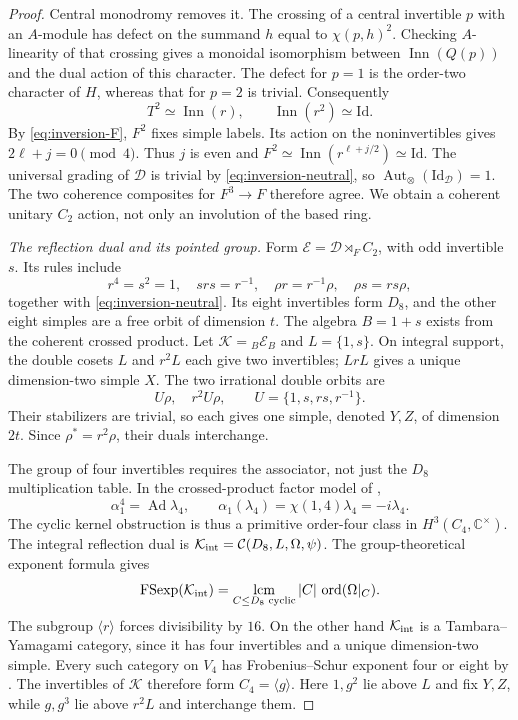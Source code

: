 \begin{proof}
Central monodromy removes it. The crossing of a central invertible
$p$ with an $A$-module has defect on the summand $h$ equal to
$\chi(p,h)^2$. Checking $A$-linearity of that crossing gives a
monoidal isomorphism between $\operatorname{Inn}(Q(p))$ and the dual
action of this character. The defect for $p=1$ is the order-two
character of $H$, whereas that for $p=2$ is trivial. Consequently
\[
 T^2\simeq\operatorname{Inn}(r),\qquad
 \operatorname{Inn}(r^2)\simeq\mathrm{Id}.
\]
By \eqref{eq:inversion-F}, $F^2$ fixes simple labels. Its action on
the noninvertibles gives $2\ell+j=0\pmod4$. Thus $j$ is even and
$F^2\simeq\operatorname{Inn}(r^{\ell+j/2})\simeq\mathrm{Id}$.
The universal grading of $\mathcal D$ is trivial by
\eqref{eq:inversion-neutral}, so
$\operatorname{Aut}_\otimes(\mathrm{Id}_{\mathcal D})=1$.
The two coherence composites for $F^3\to F$ therefore agree.
We obtain a coherent unitary $C_2$ action, not only an involution of
the based ring.

\emph{The reflection dual and its pointed group.}
Form $\mathcal E=\mathcal D\rtimes_F C_2$, with odd invertible $s$.
Its rules include
\[
 r^4=s^2=1,\quad srs=r^{-1},\quad
 \rho r=r^{-1}\rho,\quad \rho s=rs\rho,
\]
together with \eqref{eq:inversion-neutral}. Its eight invertibles form
$D_8$, and the other eight simples are a free orbit of dimension $t$.
The algebra $B=1+s$ exists from the coherent crossed product.
Let $\mathcal K={}_B\mathcal E_B$ and $L=\{1,s\}$.
On integral support, the double cosets $L$ and $r^2L$ each give two
invertibles; $LrL$ gives a unique dimension-two simple $X$.
The two irrational double orbits are
\[
 U\rho,\quad r^2U\rho,\qquad U=\{1,s,rs,r^{-1}\}.
\]
Their stabilizers are trivial, so each gives one simple, denoted $Y,Z$,
of dimension $2t$. Since $\rho^*=r^2\rho$, their duals interchange.

The group of four invertibles requires the associator, not just the
$D_8$ multiplication table. In the crossed-product factor model of
\cite[Section~12.1]{IzumiNear},
\[
 \alpha_1^4=\operatorname{Ad}\lambda_4,\qquad
 \alpha_1(\lambda_4)=\chi(1,4)\lambda_4=-i\lambda_4.
\]
The cyclic kernel obstruction is thus a primitive order-four class
in $H^3(C_4,\mathbb C^\times)$. The integral reflection dual is
$\mathcal K_{\rm int}=\mathcal C(D_8,L,\Omega,\psi)$.
The group-theoretical exponent formula
\cite[Theorem~9.2]{NgSchauenburgExponent} gives
\[
 \operatorname{FSexp}(\mathcal K_{\rm int})
 =\mathop{\rm lcm}_{C\le D_8\text{ cyclic}}
   |C|\,\operatorname{ord}(\Omega|_C).
\]
The subgroup $\langle r\rangle$ forces divisibility by $16$.
On the other hand $\mathcal K_{\rm int}$ is a Tambara--Yamagami
category, since it has four invertibles and a unique dimension-two
simple. Every such category on $V_4$ has Frobenius--Schur exponent
four or eight by \cite[Proposition~5.3]{LiuNgTotal}. The invertibles
of $\mathcal K$ therefore form $C_4=\langle g\rangle$.
Here $1,g^2$ lie above $L$ and fix $Y,Z$, while $g,g^3$ lie above
$r^2L$ and interchange them.


\end{proof}
